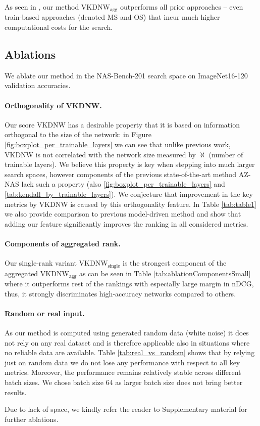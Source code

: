 As seen in , our method $\text{VKDNW}_{\text{agg}}$ outperforms all prior approaches -- even train-based approaches (denoted MS and OS) that incur much higher computational costs for the search.



\subsection{Ablations}
\label{subsec:ablation}



We ablate our method in the NAS-Bench-201 search space \cite{dong2020bench} on ImageNet16-120 \cite{chrabaszcz2017downsampled} validation accuracies.
\paragraph{Orthogonality of VKDNW.} Our score VKDNW has a desirable property that it is based on information orthogonal to the size of the network: in Figure \ref{fig:boxplot_per_trainable_layers} we can see that unlike previous work, VKDNW is not correlated with the network size measured by $\aleph$ (number of trainable layers). We believe this property is key when stepping into much larger search spaces, however components of the previous state-of-the-art method AZ-NAS lack such a property (also \cref{fig:boxplot_per_trainable_layers} and \cref{tab:kendall_by_trainable_layers}). We conjecture that improvement in the key metrics by VKDNW is caused by this orthogonality feature. In Table \ref{tab:table1} we also provide comparison to previous model-driven method and show that adding our feature significantly improves the ranking in all considered metrics.




\paragraph{Components of aggregated rank.} Our single-rank variant $\text{VKDNW}_{\text{single}}$ is the strongest component of the aggregated $\text{VKDNW}_{\text{agg}}$ as can be seen in Table \ref{tab:ablationComponentsSmall} where it outperforms rest of the rankings with especially large margin in nDCG, thus, it strongly discriminates high-accuracy networks compared to others. 


\paragraph{Random or real input.} As our method is computed using generated random data (white noise) it does not rely on any real dataset and is therefore applicable also in situations where no reliable data are available. Table \ref{tab:real_vs_random} shows that by relying just on random data we do not lose any performance with respect to all key metrics. Moreover, the performance remains relatively stable across different batch sizes. We chose batch size 64 as larger batch size does not bring better results.

Due to lack of space, we kindly refer the reader to Supplementary material for further ablations.




